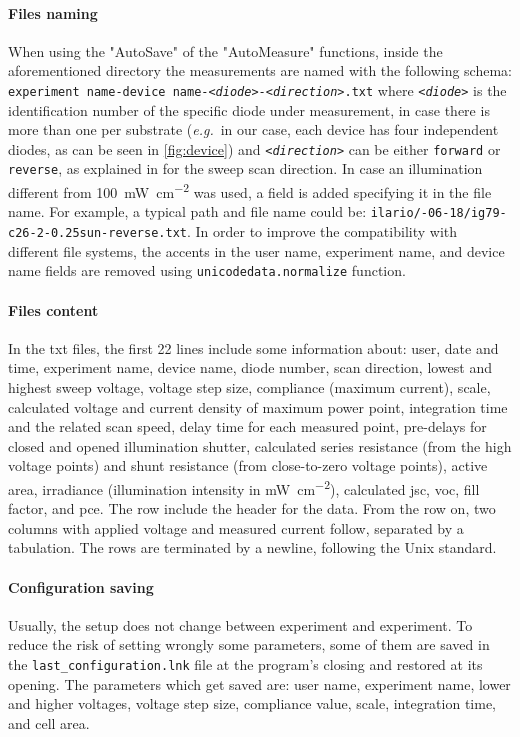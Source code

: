 \paragraph{Files naming}\label{pypv_naming_files}
When using the "AutoSave" of the "AutoMeasure" functions, inside the aforementioned directory the measurements are named with the following schema: \texttt{experiment name-device name-\textit{<diode>}-\textit{<direction>}.txt} where \textit{\texttt{<diode>}} is the identification number of the specific diode under measurement, in case there is more than one per substrate (\textsl{e.g.}\ in our case, each device has four independent diodes, as can be seen in \cref{fig:device}) and \texttt{\textit{<direction>}} can be either \texttt{forward} or \texttt{reverse}, as explained in  for the sweep scan direction.
In case an illumination different from \SI{100}{\mW\per\square\cm} was used, a field is added specifying it in the file name.
For example, a typical path and file name could be: \texttt{ilario/-06-18/\-ig79-c26-2-0.25sun-reverse.txt}.
In order to improve the compatibility with different file systems, the accents in the user name, experiment name, and device name fields are removed using \texttt{unicode\-data.\-normalize} function.

\paragraph{Files content}
In the txt files, the first 22 lines include some information about: user, date and time, experiment name, device name, diode number, scan direction, lowest and highest sweep voltage, voltage step size, compliance (maximum current), scale, calculated voltage and current density of maximum power point, integration time and the related scan speed, delay time for each measured point, pre-delays for closed and opened illumination shutter, calculated series resistance (from the high voltage points) and shunt resistance (from close\hyp{}to\hyp{}zero voltage points), active area, irradiance (illumination intensity in \si{\mW\per\square\cm}), calculated \gls{jsc}, \gls{voc}, fill factor, and \gls{pce}.
The  row include the header for the data.
From the  row on, two columns with applied voltage and measured current follow, separated by a tabulation.
The rows are terminated by a \texttt{\n} newline, following the Unix standard.

\paragraph{Configuration saving}
Usually, the setup does not change between experiment and experiment.
To reduce the risk of setting wrongly some parameters, some of them are saved in the \texttt{last\_configuration.lnk} file at the program's closing and restored at its opening.
The parameters which get saved are: user name, experiment name, lower and higher voltages, voltage step size, compliance value, scale, integration time, and cell area.

